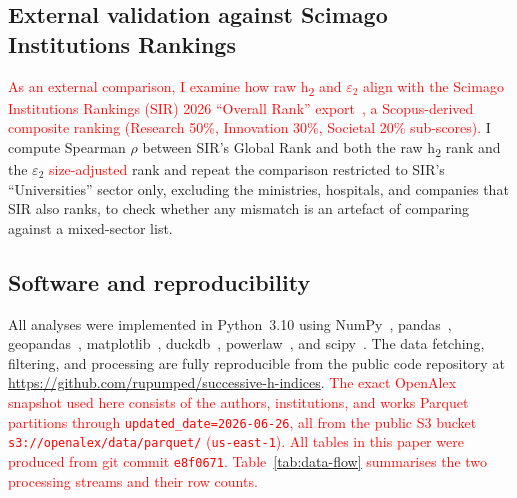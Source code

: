 \subsection{External validation against Scimago Institutions Rankings}
\label{subsec:methods-scimago}
\textcolor{red}{As an external comparison, I examine how raw h\textsubscript{2} and $\varepsilon_2$ align with the Scimago Institutions Rankings (SIR) 2026 ``Overall Rank'' export~\citep{scimago2026}, a Scopus-derived composite ranking (Research 50\%, Innovation 30\%, Societal 20\% sub-scores).}
I compute Spearman $\rho$ between SIR's Global Rank and both the raw h\textsubscript{2} rank and the $\varepsilon_2$ \textcolor{red}{size-adjusted} rank and repeat the comparison restricted to SIR's ``Universities'' sector only, excluding the ministries, hospitals, and companies that SIR also ranks, to check whether any mismatch is an artefact of comparing against a mixed-sector list.

\subsection{Software and reproducibility}
All analyses were implemented in Python~3.10 using NumPy~\citep{numpy}, pandas~\citep{pandas}, geopandas~\citep{geopandas}, matplotlib~\citep{matplotlib}, duckdb~\citep{duckdb}, powerlaw~\citep{powerlaw}, and scipy~\citep{scipy}. The data fetching, filtering, and processing are fully reproducible from the public code repository at \url{https://github.com/rupumped/successive-h-indices}. \textcolor{red}{The exact OpenAlex snapshot used here consists of the authors, institutions, and works Parquet partitions through \texttt{updated\_date=2026-06-26}, all from the public S3 bucket \texttt{s3://openalex/data/parquet/} (\texttt{us-east-1}). All tables in this paper were produced from git commit \texttt{e8f0671}. Table~\ref{tab:data-flow} summarises the two processing streams and their row counts.}

